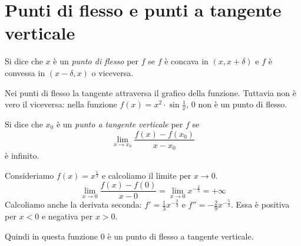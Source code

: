 \section{Punti di flesso e punti a tangente verticale}
\begin{definition}
Si dice che $x$ è un \emph{punto di flesso} per $f$ se $f$ è concava in $(x, x + \delta)$ e $f$ è convessa in $(x-\delta, x)$ o viceversa.
\end{definition}

Nei punti di flesso la tangente attraversa il grafico della funzione. Tuttavia non è vero il viceversa: nella funzione $f(x) = x^2 \cdot \sin \frac{1}{x}$, 0 non è un punto di flesso.

\begin{definition}
Si dice che $x_0$ è un \emph{punto a tangente verticale} per $f$ se
\begin{equation*}
\lim_{x \to x_0} \frac{f(x)-f(x_0)}{x-x_0}
\end{equation*}
è infinito.
\end{definition}

\begin{example}
Consideriamo $f(x) = x^\frac{1}{3}$ e calcoliamo il limite per $x \to 0$.
\begin{equation*}
\lim_{x \to 0} \frac{f(x)-f(0)}{x-0} = \lim_{x \to 0} x^{-\frac{2}{3}} = +\infty
\end{equation*}
Calcoliamo anche la derivata seconda: $f' = \frac{1}{3} x^{-\frac{2}{3}}$ e $f'' = -\frac{2}{9} x^{-\frac{5}{3}}$. Essa è positiva per $x < 0$ e negativa per $x > 0$.

Quindi in questa funzione 0 è un punto di flesso a tangente verticale.
\end{example}

